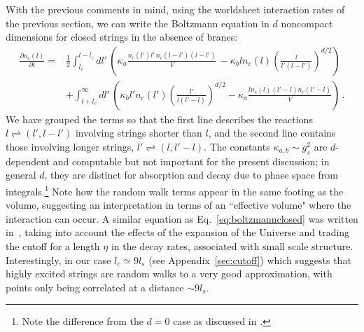\documentclass[a4paper,11pt]{article}
\newcommand{\lr}[1]{\left(#1\right)}
\begin{document}
With the previous comments in mind, using the worldsheet interaction rates of the previous section, we can write the Boltzmann equation in $d$ noncompact dimensions for closed strings in the absence of branes:
\begin{equation}\label{eq:boltzmannclosed}
\begin{split}
     \frac{\partial n_c(l)}{\partial t}= & 
     \frac{1}{2} \int_{l_c}^{l-l_c}{dl' \, \lr{\kappa_a\frac{n_c(l') l'\, n_c(l-l') (l-l')}{V}\, -\kappa_b ln_c(l) \lr{\frac{l}{l'(l-l')}}^{d/2}}}   \\ &
     +\int_{l+l_c}^\infty{dl' \,  \lr{\kappa_b l'n_c(l')\lr{\frac{l'}{l(l'-l)}}^{d/2}-\kappa_a \frac{ln_c(l)(l'-l)n_c(l'-l)}{V} }} \, .
\end{split}
\end{equation}
We have grouped the terms so that the first line describes the reactions $l \rightleftharpoons (l',l-l')$ involving strings shorter than $l$, and the second line contains those involving longer strings, $l' \rightleftharpoons (l,l'-l)$.
The constants $\kappa_{a,b}\sim g_s^2$ are $d$-dependent and computable but not important for the present discussion; in general $d$, they are distinct for absorption and decay due to phase space from integrals.\footnote{Note the difference from the $d=0$ case as discussed in \cite{Lowe:1994nm}.}
Note how the random walk terms appear in the same footing as the volume, suggesting an interpretation in terms of an ``effective volume" where the interaction can occur.
A similar equation as Eq.~\eqref{eq:boltzmannclosed} was written in~\cite{Copeland:1998na}, taking into account the effects of the expansion of the Universe and trading the cutoff for a length $\eta$ in the decay rates, associated with small scale structure.
Interestingly, in our case $l_c \simeq 9l_s$ (see Appendix~\ref{sec:cutoff}) which suggests that highly excited strings are random walks to a very good approximation, with points only being correlated at a distance $\sim 9l_s$.
\end{document}
